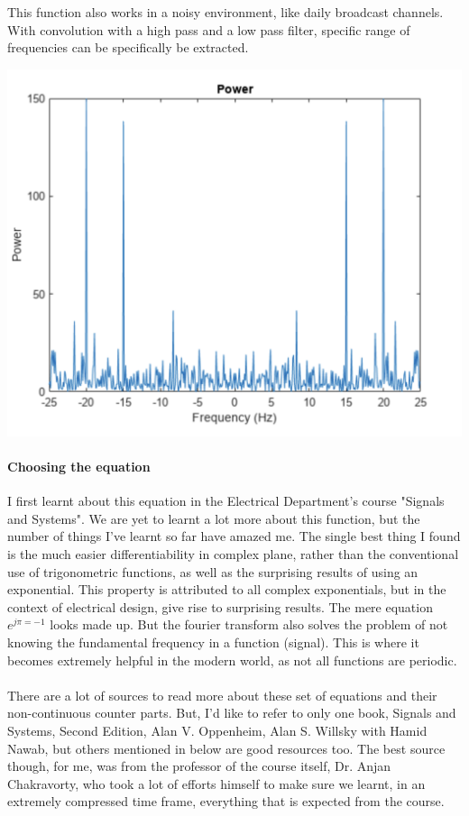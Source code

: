 \documentclass{article}
\begin{document}
This function also works in a noisy environment, like daily broadcast channels. With convolution with a high pass and a low pass filter, specific range of frequencies can be specifically be extracted.

\begin{center}
	\includegraphics[scale=0.5]{noisy.png}
\end{center}

\paragraph{Choosing the equation}
I first learnt about this equation in the Electrical Department's course "Signals and Systems". We are yet to learnt a lot more about this function, but the number of things I've learnt so far have amazed me. The single best thing I found is the much easier differentiability in complex plane, rather than the conventional use of trigonometric functions, as well as the surprising results of using an exponential.
This property is attributed to all complex exponentials, but in the context of electrical design, give rise to surprising results.
The mere equation $e^{j\pi = -1}$ looks made up. But the fourier transform also solves the problem of not knowing the
fundamental frequency in a function (signal). This is where it becomes extremely helpful in the modern world, as not all functions are periodic.

\paragraph{}
There are a lot of sources to read more about these set of equations and their non-continuous counter parts. But, I'd like to refer to only one book,
Signals and Systems, Second Edition, Alan V. Oppenheim, Alan S. Willsky with Hamid Nawab, but others mentioned in below are good resources too.
The best source though, for me, was from the professor of the course itself, Dr. Anjan Chakravorty, who took a lot of efforts himself to make sure
we learnt, in an extremely compressed time frame, everything that is expected from the course.
\end{document}
